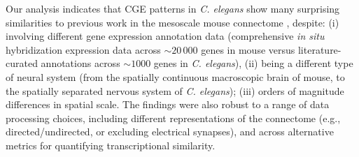 \documentclass[10pt,letterpaper]{article}
\begin{document}
{%
Our analysis indicates that CGE patterns in \emph{C. elegans} show many surprising similarities to previous work in the mesoscale mouse connectome \cite{Fulcher:2016ck}, despite:
(i) involving different gene expression annotation data (comprehensive \emph{in situ} hybridization expression data across $\sim20\,000$ genes in mouse versus literature-curated annotations across $\sim 1000$ genes in \emph{C. elegans}),
(ii) being a different type of neural system (from the spatially continuous macroscopic brain of mouse, to the spatially separated nervous system of \emph{C. elegans});
(iii) orders of magnitude differences in spatial scale.
The findings were also robust to a range of data processing choices, including different representations of the connectome (e.g., directed/undirected, or excluding electrical synapses), and across alternative metrics for quantifying transcriptional similarity.

}
\end{document}
